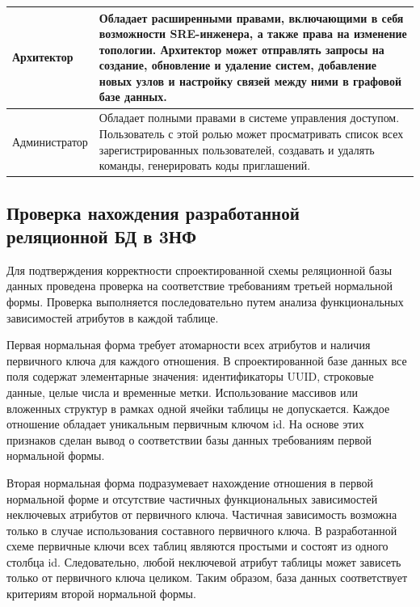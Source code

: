 \begin{center}
\begin{tabularx}{\textwidth}{|X|X|}
        Архитектор & Обладает расширенными правами, включающими в себя возможности
        SRE-инженера, а также права на изменение топологии. Архитектор может отправлять
        запросы на создание, обновление и удаление систем, добавление новых узлов и
        настройку связей между ними в графовой базе данных. \\ \hline

        Администратор & Обладает полными правами в системе управления доступом.
        Пользователь с этой ролью может просматривать список всех зарегистрированных
        пользователей, создавать и удалять команды, генерировать коды приглашений. \\ \hline
    \end{tabularx}
\end{center}

\subsection[Проверка нахождения разработанной реляционной БД в 3НФ]{Проверка нахождения разработанной \\реляционной БД в 3НФ}
Для подтверждения корректности спроектированной схемы реляционной базы данных проведена 
проверка на соответствие требованиям третьей нормальной формы. Проверка выполняется 
последовательно путем анализа функциональных зависимостей атрибутов в каждой таблице.

Первая нормальная форма требует атомарности всех атрибутов и наличия первичного ключа 
для каждого отношения. В спроектированной базе данных все поля содержат элементарные значения: 
идентификаторы UUID, строковые данные, целые числа и временные метки. Использование массивов 
или вложенных структур в рамках одной ячейки таблицы не допускается. Каждое отношение 
обладает уникальным первичным ключом id. На основе этих признаков сделан вывод о соответствии 
базы данных требованиям первой нормальной формы.

Вторая нормальная форма подразумевает нахождение отношения в первой нормальной форме и отсутствие 
частичных функциональных зависимостей неключевых атрибутов от первичного ключа. Частичная 
зависимость возможна только в случае использования составного первичного ключа. В разработанной 
схеме первичные ключи всех таблиц являются простыми и состоят из одного столбца id. Следовательно, 
любой неключевой атрибут таблицы может зависеть только от первичного ключа целиком. Таким 
образом, база данных соответствует критериям второй нормальной формы.

